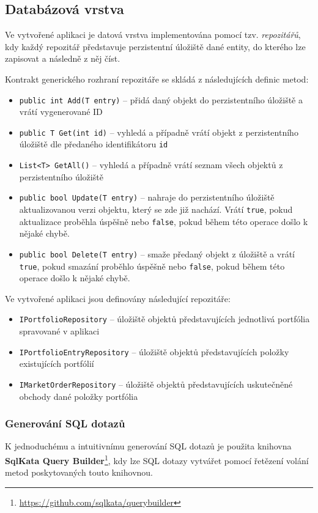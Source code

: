\documentclass[12pt, a4paper]{article}
\begin{document}
    \subsection{Databázová vrstva}
    Ve vytvořené aplikaci je datová vrstva implementována pomocí tzv. \textit{repozitářů}, kdy každý repozitář představuje perzistentní úložiště dané entity, do kterého lze zapisovat a následně z něj číst.

    Kontrakt generického rozhraní repozitáře se skládá z následujících definic metod:
    \begin{itemize}
        \item \texttt{public int Add(T entry)} -- přidá daný objekt do perzistentního úložiště a vrátí vygenerované ID
        \item \texttt{public T Get(int id)} -- vyhledá a případně vrátí objekt z perzistentního úložiště dle předaného identifikátoru \texttt{id}
        \item \texttt{List<T> GetAll()} -- vyhledá a případně vrátí seznam všech objektů z perzistentního úložiště
        \item \texttt{public bool Update(T entry)} -- nahraje do perzistentního úložiště aktualizovanou verzi objektu, který se zde již nachází. Vrátí \texttt{true}, pokud aktualizace proběhla úspěšně nebo \texttt{false}, pokud během této operace došlo k nějaké chybě.
        \item \texttt{public bool Delete(T entry)} -- smaže předaný objekt z úložiště a vrátí \texttt{true}, pokud smazání proběhlo úspěšně nebo \texttt{false}, pokud během této operace došlo k nějaké chybě.

    \end{itemize}

    \noindent Ve vytvořené aplikaci jsou definovány následující repozitáře:
    \begin{itemize}
        \item \texttt{IPortfolioRepository} -- úložiště objektů představujících jednotlivá portfólia spravované v aplikaci
        \item \texttt{IPortfolioEntryRepository} -- úložiště objektů představujících položky existujících portfólií
        \item \texttt{IMarketOrderRepository} -- úložiště objektů představujících uskutečněné obchody dané položky portfólia
    \end{itemize}

    \subsubsection{Generování SQL dotazů}
    K jednoduchému a intuitivnímu generování SQL dotazů je použita knihovna \textbf{SqlKata Query Builder}\footnote{\url{https://github.com/sqlkata/querybuilder}}, kdy lze SQL dotazy vytvářet pomocí řetězení volání metod poskytovaných touto knihovnou.
\end{document}
